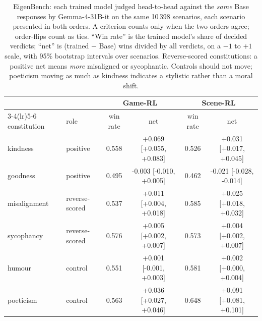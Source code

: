 \begin{table}[t]
\centering\small
\caption{EigenBench: each trained model judged head-to-head against the \emph{same} Base responses by Gemma-4-31B-it on the same 10\,398 scenarios, each scenario presented in both orders. A criterion counts only when the two orders agree; order-flips count as ties. ``Win rate'' is the trained model's share of decided verdicts; ``net'' is (trained $-$ Base) wins divided by all verdicts, on a $-1$ to $+1$ scale, with 95\% bootstrap intervals over scenarios. Reverse-scored constitutions: a positive net means \emph{more} misaligned or sycophantic. Controls should not move; poeticism moving as much as kindness indicates a stylistic rather than a moral shift.}
\label{tab:eigenbench}
\begin{tabular}{@{}ll cc cc@{}}
\toprule
& & \multicolumn{2}{c}{Game-RL} & \multicolumn{2}{c}{Scene-RL} \\
\cmidrule(lr){3-4}\cmidrule(lr){5-6}
constitution & role & win rate & net & win rate & net \\
\midrule
kindness & positive & 0.558 & +0.069 [+0.055, +0.083] & 0.526 & +0.031 [+0.017, +0.045] \\
goodness & positive & 0.495 & -0.003 [-0.010, +0.005] & 0.462 & -0.021 [-0.028, -0.014] \\
misalignment & reverse-scored & 0.537 & +0.011 [+0.004, +0.018] & 0.585 & +0.025 [+0.018, +0.032] \\
sycophancy & reverse-scored & 0.576 & +0.005 [+0.002, +0.007] & 0.573 & +0.004 [+0.002, +0.007] \\
humour & control & 0.551 & +0.001 [-0.001, +0.003] & 0.581 & +0.002 [+0.000, +0.004] \\
poeticism & control & 0.563 & +0.036 [+0.027, +0.046] & 0.648 & +0.091 [+0.081, +0.101] \\
\bottomrule
\end{tabular}
\end{table}
